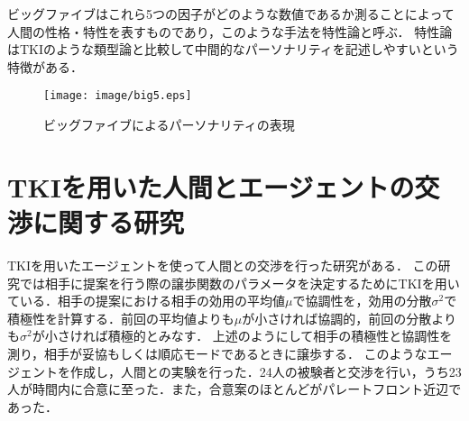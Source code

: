 ビッグファイブはこれら5つの因子がどのような数値であるか測ることによって人間の性格・特性を表すものであり，このような手法を特性論と呼ぶ．
特性論はTKIのような類型論と比較して中間的なパーソナリティを記述しやすいという特徴がある．

\begin{figure}[htb]
    \centering
    \texttt{[image: image/big5.eps]}
    \caption{ビッグファイブによるパーソナリティの表現}
    \label{fig:big5}
\end{figure}

\section{TKIを用いた人間とエージェントの交渉に関する研究}
TKIを用いたエージェントを使って人間との交渉を行った研究がある\cite{tki-ha}．
この研究では相手に提案を行う際の譲歩関数のパラメータを決定するためにTKIを用いている．相手の提案における相手の効用の平均値$\mu$で協調性を，効用の分散$\sigma^2$で積極性を計算する．前回の平均値よりも$\mu$が小さければ協調的，前回の分散よりも$\sigma^2$が小さければ積極的とみなす．
上述のようにして相手の積極性と協調性を測り，相手が妥協もしくは順応モードであるときに譲歩する．
このようなエージェントを作成し，人間との実験を行った．24人の被験者と交渉を行い，うち23人が時間内に合意に至った．また，合意案のほとんどがパレートフロント近辺であった．

